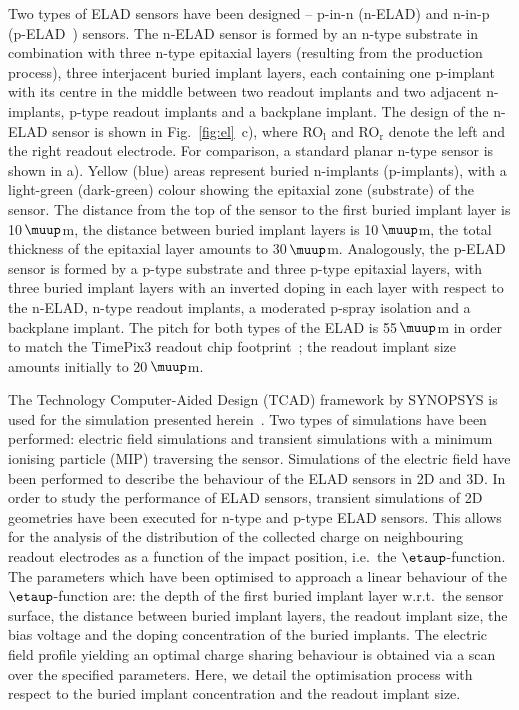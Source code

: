\documentclass[a4paper,11pt]{article}
\begin{document}
Two types of ELAD sensors have been designed -- p-in-n (n-ELAD) and n-in-p (p-ELAD~\cite{elad}) sensors.
The n-ELAD sensor is formed by an n-type substrate in combination with three n-type epitaxial layers (resulting from the production process),
 three interjacent buried implant layers, each containing one p-implant with its centre in the middle between two readout implants and two adjacent n-implants,
 p-type readout implants and a backplane implant.
The design of the n-ELAD sensor is shown in Fig.~\ref{fig:el}~c), where RO$_{\textrm{l}}$ and RO$_{\textrm{r}}$ denote the left and the right readout electrode.
For comparison, a standard planar n-type sensor is shown in a).
Yellow (blue) areas represent buried n-implants (p-implants), with a light-green (dark-green) colour showing the epitaxial zone (substrate) of the sensor. 
The distance from the top of the sensor to the first buried implant layer is 10\,$\muup$m, the distance between buried implant layers is 10\,$\muup$m, the total thickness of the epitaxial layer amounts to 30\,$\muup$m.
Analogously, the p-ELAD sensor is formed by a p-type substrate and three p-type epitaxial layers,
 with three buried implant layers with an inverted doping in each layer with respect to the n-ELAD,
 n-type readout implants, a moderated p-spray isolation and a backplane implant.
The pitch for both types of the ELAD is 55\,$\muup$m in order to match the TimePix3 readout chip footprint~\cite{tp3}; the readout implant size amounts initially to 20\,$\muup$m.

The Technology Computer-Aided Design (TCAD) framework by SYNOPSYS is used for the simulation presented herein~\cite{syn}.
Two types of simulations have been performed: electric field simulations and transient simulations with a minimum ionising particle (MIP) traversing the sensor.
Simulations of the electric field have been performed to describe the behaviour of the ELAD sensors in 2D and 3D.
In order to study the performance of ELAD sensors, transient simulations of 2D geometries have been executed for n-type and p-type ELAD sensors.
This allows for the analysis of the distribution of the collected charge on neighbouring readout electrodes as a function of the impact position, i.e.\ the $\etaup$-function.
The parameters which have been optimised to approach a linear behaviour of the $\etaup$-function are: the depth of the first buried implant layer w.r.t.\ the sensor surface, the distance between buried implant layers,
 the readout implant size, the bias voltage and the doping concentration of the buried implants. 
The electric field profile yielding an optimal charge sharing behaviour is obtained via a scan over the specified parameters.
Here, we detail the optimisation process with respect to the buried implant concentration and the readout implant size.
\end{document}
